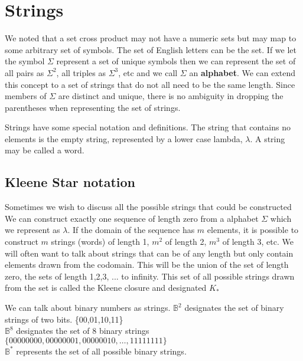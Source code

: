 
\section{Strings}
We noted that a set cross product may not have a numeric sets but may map to some arbitrary set of symbols. The set of English letters can be the set. If we let the symbol $\Sigma$ represent a set of unique symbols then we can represent the set of all pairs as $\Sigma^2$, all triples as $\Sigma^3$, etc and we call $\Sigma$ an \textbf{alphabet}. We can extend this concept to a set of strings that do not all need to be the same length. Since members of $\Sigma$ are distinct and unique, there is no ambiguity in dropping the parentheses when representing the set of strings. 

Strings have some special notation and definitions. The string that contains no elements is the empty string, represented by a lower case lambda, $\lambda$. A string may be called a word.





    \subsection {Kleene Star notation}
Sometimes we wish to discuss all the possible strings that could be constructed  We can construct exactly one sequence of length zero from a alphabet $\Sigma$ which we represent as $\lambda$. If the domain of the sequence has $m$ elements, it is possible to construct $m$ strings (words) of length 1, $m^2$ of length 2, $m^3$ of length 3, etc. We will often want to talk about strings that can be of any length but only contain elements drawn from the codomain. This will be the union of the set of length zero, the sets of length 1,2,3, ... to infinity. This set of all possible strings drawn from the set is called the Kleene closure and designated $K_*$

We can talk about binary numbers as strings. 
$\mathbb{B}^2$ designates the set of binary strings of two bits.  \{00,01,10,11\}\\
$\mathbb{B}^8$ designates the set of 8 binary strings $\{00000000, 00000001, 00000010, \dots ,11111111\}$ \\
$\mathbb{B}^*$ represents the set of all possible binary strings.


